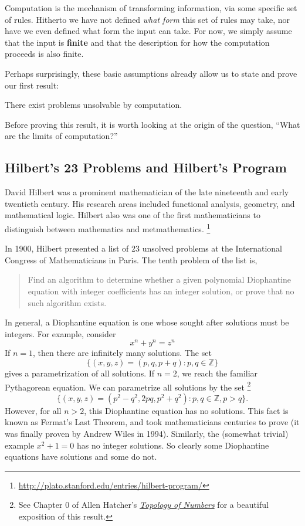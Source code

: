 \documentclass[english, 12pt]{article}
\begin{document}
  Computation is the mechanism of transforming information, via some specific
  set of rules. Hitherto we have not defined {\it what form} this set
  of rules may take, nor have we even defined what form the input can take.
  For now, we simply assume that the input is {\bf finite} and that the
  description for how the computation proceeds is also finite. \n

  Perhaps surprisingly, these basic assumptions already allow us to state
  and prove our first result: 
  \begin{thrm} There exist problems unsolvable by computation.
  \end{thrm}
  Before proving this result, it is worth looking at the origin of the 
  question, ``What are the limits of computation?'' \n
  \subsection{Hilbert's 23 Problems and Hilbert's Program}
  David Hilbert was a prominent mathematician of the late nineteenth and
  early twentieth century. His research areas included functional analysis,
  geometry, and mathematical logic. Hilbert also was one of the first
  mathematicians to distinguish between mathematics and metmathematics.
  \footnote{\url{http://plato.stanford.edu/entries/hilbert-program/}} \n

  In 1900, Hilbert presented a list of 23 unsolved problems at the
  International Congress of Mathematicians in Paris. The tenth problem
  of the list is,
  \begin{quote}
      Find an algorithm to determine whether a given polynomial Diophantine 
      equation with integer coefficients has an integer solution, or prove
      that no such algorithm exists.
  \end{quote}
  In general, a Diophantine equation is one whose sought after solutions must
  be integers. For example, consider
  \[ x^n + y^n = z^n \]
  If $n = 1$, then there are infinitely many solutions. The set 
  \[ \{(x, y, z) = (p, q, p + q) : p, q \in \mathbb{Z}\} \] gives a
  parametrization of all solutions. If $n = 2$, we reach the familiar
  Pythagorean equation. We can parametrize all solutions by the set
  \footnote{See Chapter 0 of Allen Hatcher's {\it 
  \href{http://www.math.cornell.edu/~hatcher/TN/TNpage.html}
       {Topology of Numbers} } for a beautiful exposition of this result.}
  \[ \{ (x, y, z) = (p^2 - q^2, 2pq, p^2 + q^2) : p, q \in \mathbb{Z}, p > q
  \}. \]
  However, for all $n > 2$, this Diophantine equation has no solutions. This
  fact is known as Fermat's Last Theorem, and took mathematicians centuries
  to prove (it was finally proven by Andrew Wiles in 1994). Similarly, the
  (somewhat trivial) example \(x^2 + 1 = 0\) has no integer solutions. So 
  clearly some Diophantine equations have solutions and some do not. \n
\end{document}
